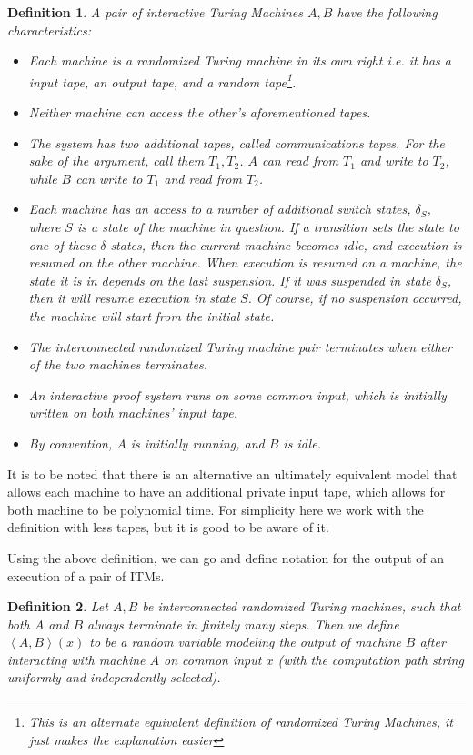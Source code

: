 \documentclass{article}
\newtheorem{definition}{Definition}
\begin{document}
\begin{definition}
A pair of interactive Turing Machines $A, B$ have the following characteristics:
\begin{itemize}
    \item Each machine is a randomized Turing machine in its own right i.e. it has a input tape, an output tape, and a random tape\footnote{This is an alternate equivalent definition of randomized Turing Machines, it just makes the explanation easier}. 
    \item Neither machine can access the other's aforementioned tapes. 
    \item The system has two additional tapes, called communications tapes. For the sake of the argument, call them $T_1, T_2$. $A$ can read from $T_1$ and write to $T_2$, while $B$ can write to $T_1$ and read from $T_2$. 
    \item Each machine has an access to a number of additional switch states, $\delta_S$, where $S$ is a state of the machine in question. If a transition sets the state to one of these $\delta$-states, then the current machine becomes idle, and execution is resumed on the other machine. When execution is resumed on a machine, the state it is in depends on the last suspension. If it was suspended in state $\delta_S$, then it will resume execution in state $S$. Of course, if no suspension occurred, the machine will start from the initial state. 
    \item The interconnected randomized Turing machine pair terminates when either of the two machines terminates. 
    \item An interactive proof system runs on some common input, which is initially written on both machines' input tape. 
    \item By convention, $A$ is initially running, and $B$ is idle. 
\end{itemize}
\end{definition}

It is to be noted that there is an alternative an ultimately equivalent model that allows each machine to have an additional private input tape, which allows for both machine to be polynomial time. For simplicity here we work with the definition with less tapes, but it is good to be aware of it. 

Using the above definition, we can go and define notation for the output of an execution of a pair of ITMs. 

\begin{definition}
Let $A, B$ be interconnected randomized Turing machines, such that both $A$ and $B$ always terminate in finitely many steps. Then we define $\left<A, B \right>(x)$ to be a random variable modeling the output of machine $B$ after interacting with machine $A$ on common input $x$ (with the computation path string uniformly and independently selected). 
\end{definition}
\end{document}
